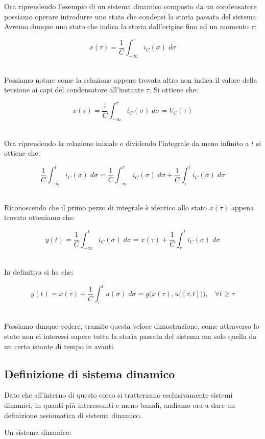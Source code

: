 \documentclass[../main.tex]{subfiles}
\begin{document}
Ora riprendendo l'esempio di un sistema dinamico composto da un condensatore possiamo operare introdurre uno stato che condensi la storia passata del sistema.
Avremo dunque uno stato che indica la storia dall'origine fino ad un momento $\tau$:

\[ x(\tau) = \frac{1}{C} \int_{-\infty}^\tau i_C(\sigma)\;d\sigma\]\

Possiamo notare come la relazione appena trovata altro non indica il valore della tensione ai capi del condensatore all'instante $\tau$. Si ottiene che:

\[ x(\tau) = \frac{1}{C} \int_{-\infty}^\tau i_C(\sigma)\;d\sigma = V_C(\tau) \]\

Ora riprendendo la relazione iniziale e dividendo l'integrale da meno infinito a $t$ si ottiene che:

\[ \frac{1}{C} \int_{-\infty}^t i_C(\sigma)\;d\sigma = \frac{1}{C} \int_{-\infty}^\tau i_C(\sigma)\;d\sigma + \frac{1}{C} \int_{\tau}^t i_C(\sigma)\;d\sigma \]\

Riconoscendo che il primo pezzo di integrale è identico allo stato $x(\tau)$ appena trovato otteniamo che:


\[ y(t) = \frac{1}{C} \int_{-\infty}^t i_C(\sigma)\;d\sigma = x(\tau) + \frac{1}{C} \int_{\tau}^t i_C(\sigma)\;d\sigma\]\

In definitiva si ha che:

\[ y(t) = x(\tau) + \frac{1}{C} \int_{\tau}^t u(\sigma)\;d\sigma = g\big( x(\tau), u\big( [\tau, t]\big) \big), \hspace{10pt} \forall t \geq \tau  \]\

Possiamo dunque vedere, tramite questa veloce dimostrazione, come attraverso lo stato non ci interessi sapere tutta la storia passata del sistema ma solo quella da un certo istante di tempo in avanti.

\subsection{Definizione di sistema dinamico}

Dato che all'interno di questo corso si tratteranno esclusivamente sistemi dinamici, in quanti più interessanti e meno banali, andiamo ora a dare un definizione assiomatica di sistema dinamico.

\begin{definition}
\end{definition}

Un sistema dinamico:
\end{document}
